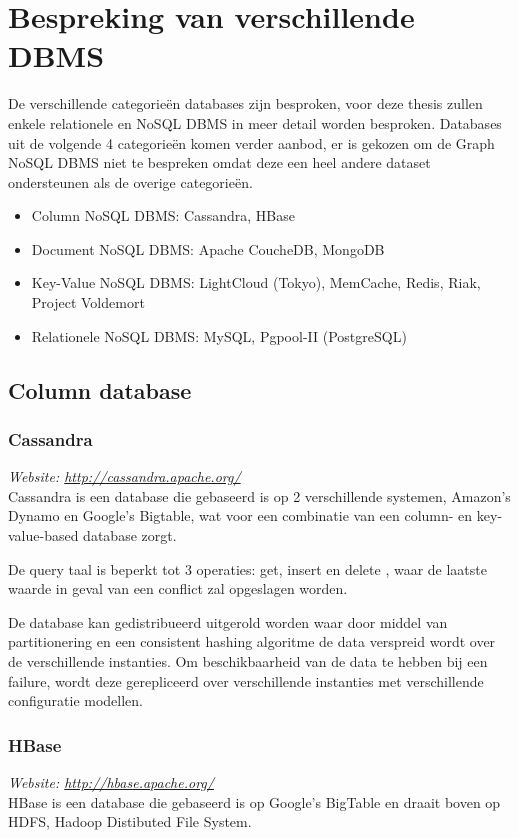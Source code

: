 \section{Bespreking van verschillende DBMS}
De verschillende categorieën databases zijn besproken, voor deze thesis zullen enkele relationele en NoSQL DBMS in meer detail worden besproken. Databases uit de volgende 4 categorieën komen verder aanbod, er is gekozen om de Graph NoSQL DBMS niet te bespreken omdat deze een heel andere dataset ondersteunen als de overige categorieën. 
\begin{itemize}
\item Column NoSQL DBMS: Cassandra, HBase
\item Document NoSQL DBMS: Apache CoucheDB, MongoDB
\item Key-Value NoSQL DBMS: LightCloud (Tokyo), MemCache, Redis, Riak, Project Voldemort
\item Relationele NoSQL DBMS: MySQL, Pgpool-II (PostgreSQL)
\end{itemize}

\subsection{Column database}
\subsubsection{Cassandra}
\textit{Website: \url{http://cassandra.apache.org/}}\\
Cassandra is een database die gebaseerd is op 2 verschillende systemen, Amazon's Dynamo en Google's Bigtable, wat voor een combinatie van een column- en key-value-based database zorgt. 

De query taal is beperkt tot 3 operaties: get, insert en delete \cite{Lakshman:2010:CDS:1773912.1773922}, waar de  laatste waarde in geval van een conflict zal opgeslagen worden.

De database kan gedistribueerd uitgerold worden waar door middel van partitionering en een consistent hashing algoritme de data verspreid wordt over de verschillende instanties. Om beschikbaarheid van de data te hebben bij een failure, wordt deze gerepliceerd over verschillende instanties met verschillende configuratie modellen. 

\subsubsection{HBase}
\textit{Website: \url{http://hbase.apache.org/}}\\
HBase is een database die gebaseerd is op Google's BigTable en draait boven op HDFS, Hadoop Distibuted File System.

